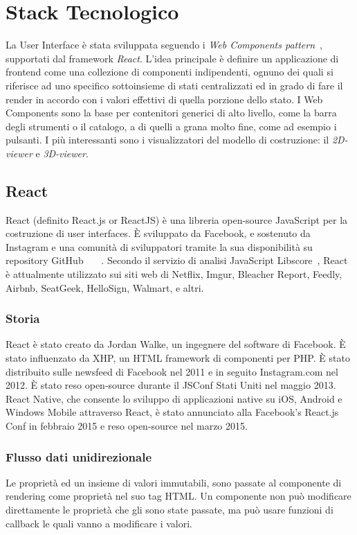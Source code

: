 \section{Stack Tecnologico}
\label{sec:chapter_2_section_3}

La User Interface è stata sviluppata seguendo i \emph{Web Components pattern}~\cite{web_components},
supportati dal framework \emph{React}.
L'idea principale è definire un applicazione di frontend come una collezione di componenti indipendenti,
ognuno dei quali si riferisce ad uno specifico sottoinsieme di stati centralizzati ed in grado
di fare il render in accordo con i valori effettivi di quella porzione dello stato.
I Web Components sono la base per contenitori generici di alto livello, come la barra degli strumenti o il catalogo,
a di quelli a grana molto fine, come ad esempio i pulsanti. I più interessanti sono i visualizzatori del
modello di costruzione: il \emph{2D-viewer} e \emph{3D-viewer}.

\subsection{React}
\label{sec:chapter_2_section_3_sub_1}
React (definito React.js or ReactJS) è una libreria open-source JavaScript per la costruzione di user interfaces.
\`E sviluppato da Facebook, e sostenuto da Instagram e una comunità di sviluppatori tramite la sua disponibilità su repository GitHub
~\cite{infoworld}~\cite{facebookreact}~\cite{reactjs}. Secondo il servizio di analisi JavaScript Libscore~\cite{libscope},
React è attualmente utilizzato sui  siti web di Netflix, Imgur, Bleacher Report, Feedly, Airbnb, SeatGeek,
HelloSign, Walmart, e altri.

\subsubsection{Storia}
React è stato creato da Jordan Walke, un ingegnere del software di Facebook. \`E stato influenzato da XHP, un HTML
framework di componenti per PHP. \`E stato distribuito sulle newsfeed di Facebook nel 2011 e in seguito
Instagram.com nel 2012. \`E stato reso open-source durante il JSConf Stati Uniti nel maggio 2013.
React Native, che consente lo sviluppo di applicazioni native su iOS, Android e Windows Mobile attraverso React,
è stato annunciato alla Facebook's React.js Conf in febbraio 2015 e reso open-source nel marzo 2015.

\subsubsection{Flusso dati unidirezionale}
Le propriet\`a ed un insieme di valori immutabili, sono passate al componente di rendering come propriet\`a nel suo tag HTML.
Un componente non pu\`o modificare direttamente le propriet\`a che gli sono state passate, ma pu\`o usare funzioni di
callback le quali vanno a modificare i valori.

